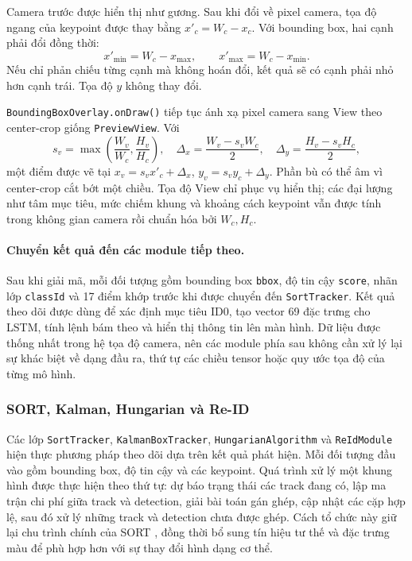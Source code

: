 Camera trước được hiển thị như gương. Sau khi đổi về pixel camera, tọa độ ngang của keypoint được thay bằng $x'_c=W_c-x_c$. Với bounding box, hai cạnh phải đổi đồng thời:
\begin{equation}
x'_{\min}=W_c-x_{\max},\qquad x'_{\max}=W_c-x_{\min}.
\end{equation}
Nếu chỉ phản chiếu từng cạnh mà không hoán đổi, kết quả sẽ có cạnh phải nhỏ hơn cạnh trái. Tọa độ $y$ không thay đổi.

\texttt{BoundingBoxOverlay.onDraw()} tiếp tục ánh xạ pixel camera sang View theo center-crop giống \texttt{PreviewView}. Với
\begin{equation}
s_v=\max\!\left(\frac{W_v}{W_c},\frac{H_v}{H_c}\right),\quad
\Delta_x=\frac{W_v-s_vW_c}{2},\quad
\Delta_y=\frac{H_v-s_vH_c}{2},
\end{equation}
một điểm được vẽ tại $x_v=s_vx'_c+\Delta_x$, $y_v=s_vy_c+\Delta_y$. Phần bù có thể âm vì center-crop cắt bớt một chiều. Tọa độ View chỉ phục vụ hiển thị; các đại lượng như tâm mục tiêu, mức chiếm khung và khoảng cách keypoint vẫn được tính trong không gian camera rồi chuẩn hóa bởi $W_c,H_c$.

\paragraph{Chuyển kết quả đến các module tiếp theo.}
Sau khi giải mã, mỗi đối tượng gồm bounding box \texttt{bbox}, độ tin cậy \texttt{score}, nhãn lớp \texttt{classId} và 17 điểm khớp trước khi được chuyển đến \texttt{SortTracker}. Kết quả theo dõi được dùng để xác định mục tiêu ID0, tạo vector 69 đặc trưng cho LSTM, tính lệnh bám theo và hiển thị thông tin lên màn hình. Dữ liệu được thống nhất trong hệ tọa độ camera, nên các module phía sau không cần xử lý lại sự khác biệt về dạng đầu ra, thứ tự các chiều tensor hoặc quy ước tọa độ của từng mô hình.

\subsubsection{SORT, Kalman, Hungarian và Re-ID}

Các lớp \texttt{SortTracker}, \texttt{KalmanBoxTracker}, \texttt{HungarianAlgorithm} và \texttt{ReIdModule} hiện thực phương pháp theo dõi dựa trên kết quả phát hiện. Mỗi đối tượng đầu vào gồm bounding box, độ tin cậy và các keypoint. Quá trình xử lý một khung hình được thực hiện theo thứ tự: dự báo trạng thái các track đang có, lập ma trận chi phí giữa track và detection, giải bài toán gán ghép, cập nhật các cặp hợp lệ, sau đó xử lý những track và detection chưa được ghép. Cách tổ chức này giữ lại chu trình chính của SORT , đồng thời bổ sung tín hiệu tư thế và đặc trưng màu để phù hợp hơn với sự thay đổi hình dạng cơ thể.

